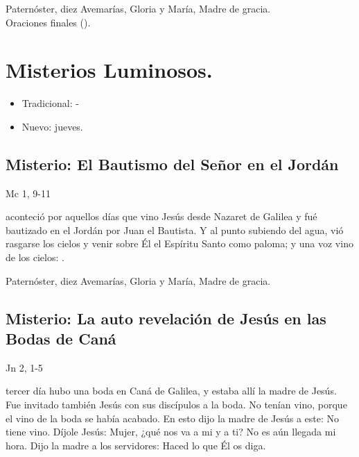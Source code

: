 \documentclass[./00_main.tex]{subfiles}
\newcounter{lux-counter}
\begin{document}
\begin{center}
      Paternóster, diez Avemarías, Gloria y María, Madre de gracia.\\
      Oraciones finales ().
\end{center}

\section*{Misterios Luminosos.}
\begin{itemize}
      \item Tradicional: -
      \item Nuevo: jueves.
\end{itemize}

\subsection*{ Misterio: El Bautismo del Señor en el Jordán}
\begin{flushright}
      {\color{red}Mc 1, 9-11}
\end{flushright}
 aconteció por aquellos días que vino Jesús desde Nazaret de Galilea y fué bautizado en el Jordán por Juan el Bautista. 
Y al punto subiendo del agua, vió rasgarse los cielos y venir sobre Él el Espíritu Santo como paloma; y una voz vino de los cielos: 
.

\begin{center}
      Paternóster, diez Avemarías, Gloria y María, Madre de gracia.
\end{center}

\subsection*{ Misterio: La auto revelación de Jesús en las Bodas de Caná}
\begin{flushright}
      {\color{red}Jn 2, 1-5}
\end{flushright}
 tercer día hubo una boda en Caná de Galilea, y estaba allí la madre de Jesús. Fue invitado también Jesús con sus discípulos a la boda. 
No tenían vino, porque el vino de la boda se había acabado. En esto dijo la madre de Jesús a este: No tiene vino. Díjole Jesús: Mujer, 
¿qué nos va a mi y a ti? No es aún llegada mi hora. Dijo la madre a los servidores: Haced lo que Él os diga.
\end{document}
